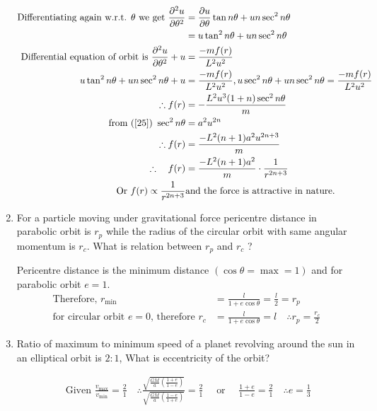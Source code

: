 \begin{enumerate}
\begin{answer}
\begin{align}
	\text{Differentiating again w.r.t. $\theta$ we get }\frac{\partial^{2} u}{\partial \theta^{2}}&=\frac{\partial u}{\partial \theta} \tan n \theta+u n \sec ^{2} n \theta\notag\\&=u \tan ^{2} n \theta+u n \sec ^{2} n \theta\notag\\
	\text{ Differential equation of orbit is }\frac{\partial^{2} u}{\partial \theta^{2}}+u&=\frac{-m f(r)}{L^{2} u^{2}}\notag\\
	u \tan ^{2} n \theta+u n \sec ^{2} n \theta+u&=\frac{-m f(r)}{L^{2} u^{2}}, u \sec ^{2} n \theta+u n \sec ^{2} n \theta=\frac{-m f(r)}{L^{2} u^{2}}\notag\\
	\therefore f(r)&=-\frac{L^{2} u^{3}(1+n) \sec ^{2} n \theta}{m}\notag\\
	\text{from (\ref{25}) }\sec ^{2} n \theta&=a^{2} u^{2 n}\notag\\
	\therefore f(r)&=\frac{-L^{2}(n+1) a^{2} u^{2 n+3}}{m}\notag\\
	\therefore \quad f(r)&=\frac{-L^{2}(n+1) a^{2}}{m} \cdot \frac{1}{r^{2 n+3}}\notag\\
	\text{Or }
	f(r) \propto \frac{1}{r^{2 n+3}}&
	\text{and the force is attractive in nature.}\notag
	\end{align}
\end{answer}
	\item  For a particle moving under gravitational force pericentre distance in parabolic orbit is $r_{p}$ while the radius of the circular orbit with same angular momentum is $r_{c}$. What is relation between $r_{p}$ and $r_c$ ?
\begin{answer}
	Pericentre distance is the minimum distance $(\cos \theta=\max =1)$ and for parabolic orbit $e=1 .$
	\begin{align*}
	\text{Therefore, }r_{\min }&=\frac{l}{1+e \cos \theta}=\frac{l}{2}=r_{p}\\
	\text{for circular orbit $e=0$, therefore }r_{c}&=\frac{l}{1+e \cos \theta}=l \quad \therefore r_{p}=\frac{r_{c}}{2}
	\end{align*}
\end{answer}
\item  Ratio of maximum to minimum speed of a planet revolving around the sun in an elliptical orbit is $2: 1$, What is eccentricity of the orbit?
\begin{answer}
	\begin{align*}
	\text{	Given }\frac{v_{\max }}{v_{\min }}=\frac{2}{1} \quad\therefore \frac{\sqrt{\frac{G M}{a}\left(\frac{1+e}{1-e}\right)}}{\sqrt{\frac{G M}{a}\left(\frac{1-e}{1+e}\right)}}=\frac{2}{1} \quad\text{ or }\quad \frac{1+e}{1-e}=\frac{2}{1} \quad \therefore e=\frac{1}{3}

\end{align*}
\end{answer}
\end{enumerate}
